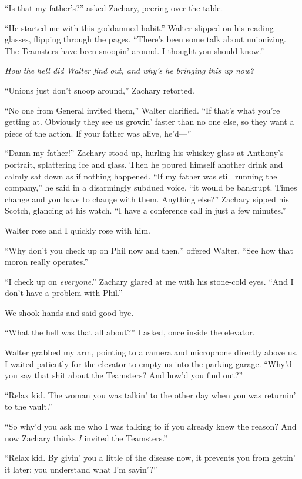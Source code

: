 ``Is that my father's?'' asked Zachary, peering over the table.

``He started me with this goddamned habit.'' Walter slipped on his
reading glasses, flipping through the pages. ``There's been some talk
about unionizing. The Teamsters have been snoopin' around. I thought you
should know.''

\emph{How the hell did Walter find out, and why's he bringing this up
now?}

``Unions just don't snoop around,'' Zachary retorted.

``No one from General invited them,'' Walter clarified. ``If that's what
you're getting at. Obviously they see us growin' faster than no one
else, so they want a piece of the action. If your father was alive,
he'd---''

``Damn my father!'' Zachary stood up, hurling his whiskey glass at
Anthony's portrait, splattering ice and glass. Then he poured himself
another drink and calmly sat down as if nothing happened. ``If my father
was still running the company,'' he said in a disarmingly subdued voice,
``it would be bankrupt. Times change and you have to change with them.
Anything else?'' Zachary sipped his Scotch, glancing at his watch. ``I
have a conference call in just a few minutes.''

Walter rose and I quickly rose with him.

``Why don't you check up on Phil now and then,'' offered Walter. ``See
how that moron really operates.''

``I check up on \emph{everyone}.'' Zachary glared at me with his
stone-cold eyes. ``And I don't have a problem with Phil.''

We shook hands and said good-bye.

``What the hell was that all about?'' I asked, once inside the elevator.

Walter grabbed my arm, pointing to a camera and microphone directly
above us. I waited patiently for the elevator to empty us into the
parking garage. ``Why'd you say that shit about the Teamsters? And how'd
you find out?''

``Relax kid. The woman you was talkin' to the other day when you was
returnin' to the vault.''

``So why'd you ask me who I was talking to if you already knew the
reason? And now Zachary thinks \emph{I} invited the Teamsters.''

``Relax kid. By givin' you a little of the disease now, it prevents you
from gettin' it later; you understand what I'm sayin'?''

